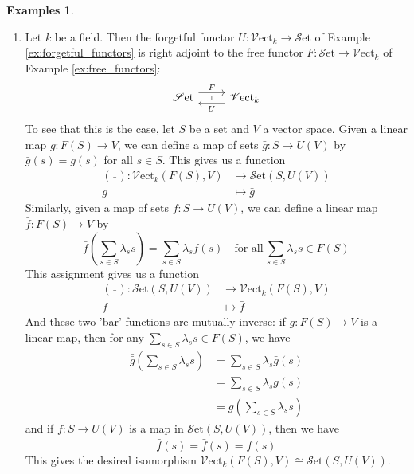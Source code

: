 \documentclass[10pt,oneside]{book}
\def\~#1{\mathscr{#1}}
\newcommand{\Set}{\~S\mathrm{et}}
\newcommand{\Vect}{\~V\mathrm{ect}}
\theoremstyle{plain}
\theoremstyle{definition}
\newtheorem{exs}[thm]{Examples}
\theoremstyle{remark}
\numberwithin{equation}{section}
\numberwithin{figure}{section}
\begin{document}
\begin{exs}
\label{ex:adjoints}
\hfill
    \begin{enumerate}[label=(\roman*)]
        \item \label{ex:adjoint_vspace} Let $k$ be a field. Then the forgetful functor $U: \Vect_k \to \Set$ of Example \ref{ex:forgetful_functors} is right adjoint to the free functor $F: \Set \to \Vect_k$ of Example \ref{ex:free_functors}:
        \[\begin{tikzcd}
            {\Set} & {\Vect_k}
            \arrow[""{name=0, anchor=center, inner sep=0}, "F", shift left=2, from=1-1, to=1-2]
            \arrow[""{name=1, anchor=center, inner sep=0}, "U", shift left=2, from=1-2, to=1-1]
            \arrow["\dashv"{anchor=center, rotate=-90}, draw=none, from=0, to=1]
        \end{tikzcd}\]
        To see that this is the case, let $S$ be a set and $V$ a vector space. Given a linear map $g: F(S) \to V$, we can define a map of sets $\bar{g}: S \to U(V)$ by $\bar{g}(s) = g(s)$ for all $s \in S$. This gives us a function 
        \begin{align*}
            (\bar{\,\,\,}): \Vect_k(F(S), V) &\to \Set(S, U(V)) \\
            g &\mapsto \bar{g}
        \end{align*}
        Similarly, given a map of sets $f: S \to U(V)$, we can define a linear map $\bar{f}: F(S) \to V$ by 
        \[\bar{f}\left(\sum_{s \in S} \lambda_s s \right) = \sum_{s \in S} \lambda_s f(s) \quad \text{for all} \,  \sum_{s \in S} \lambda_s s  \in F(S)\]
        This assignment gives us a function 
        \begin{align*}
            (\bar{\,\,\,}): \Set \left(S, U(V) \right) &\to \Vect_k \left(F(S), V \right) \\
            f &\mapsto \bar{f}
        \end{align*}
        And these two 'bar' functions are mutually inverse: if $g: F(S) \to V$ is a linear map, then for any $\sum_{s \in S}\lambda_s s \in F(S)$, we have
        \begin{align*}
            \bar{\bar{g}} \left(\sum_{s \in S}\lambda_s s\right) &= \sum_{s \in S} \lambda_s \bar{g}(s) \\
            &= \sum_{s \in S} \lambda_s g(s) \\
            &= g \left(\sum_{s \in S}\lambda_s s\right)
        \end{align*}
        and if $f: S \to U(V)$ is a map in $\Set(S, U(V))$, then we have
        \[\bar{\bar{f}}(s) = \bar{f}(s) = f(s)\]
        This gives the desired isomorphism $\Vect_k(F(S), V) \cong \Set(S, U(V))$.



\end{enumerate}
\end{exs}
\end{document}
